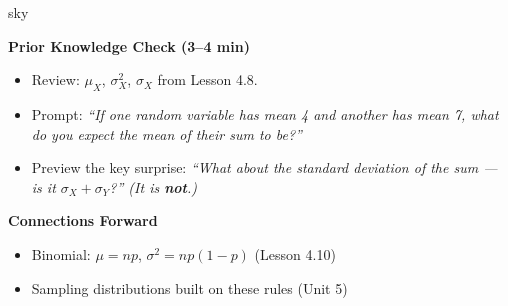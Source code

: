 \documentclass[10pt]{article}
\begin{document}
\begin{skillbox}{sky}
    \begin{minipage}[t]{0.58\linewidth}\vspace{0pt}
        \textbf{Prior Knowledge Check (3--4 min)}
        \begin{itemize}
            \item Review: $\mu_X$, $\sigma^2_X$, $\sigma_X$ from Lesson 4.8.
            \item Prompt: \textit{``If one random variable has mean 4 and another has mean 7,
                  what do you expect the mean of their sum to be?''}
            \item Preview the key surprise: \textit{``What about the standard deviation of
                  the sum --- is it $\sigma_X + \sigma_Y$?'' (It is \textbf{not}.)}
        \end{itemize}
        \textbf{Connections Forward}
        \begin{itemize}
            \item Binomial: $\mu = np$, $\sigma^2 = np(1-p)$ (Lesson 4.10)
            \item Sampling distributions built on these rules (Unit 5)
        \end{itemize}
    \end{minipage}
    \hfill
    \begin{minipage}[t]{0.38\linewidth}\vspace{0pt}\centering
    \end{minipage}
\end{skillbox}
\end{document}
